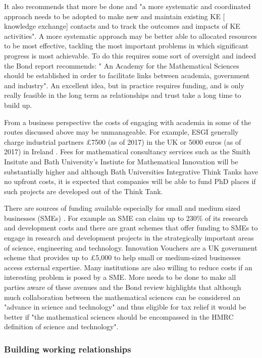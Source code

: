 \documentclass[11pt]{article} %
\begin{document}
	It also recommends that more be done  and "a more systematic and coordinated approach needs to be adopted to make new and maintain existing KE [ knowledge exchange] contacts and to track the outcomes and impacts of KE activities". A more systematic approach may be better able to allocated resources to be most effective, tackling the most important problems in which significant progress is most achievable. To do this requires some sort of oversight and indeed the Bond report recommends: " An Academy for the Mathematical Sciences should be established in order to facilitate links between academia, government and industry". An excellent idea, but in practice requires funding, and is only really feasible in the long term as relationships and trust take a long time to build up. 
	
	From a business perspective the costs of engaging with academia in some of the routes discussed above may be unmanageable. For example, ESGI generally charge industrial partners  £7500 (as of 2017) in the UK or 5000  euros (as of 2017) in Ireland \cite{ESGIhandbook}. Fees for mathematical consultancy services such as the Smith Insitute and Bath University's Instiute for Mathematical Innovation will be substantially higher and although Bath Universities Integrative Think Tanks have no upfront costs, it is expected that companies will be able to fund PhD places if such projects are developed out of the Think Tank. 
	
	There are sources of funding available especially for small and medium sized businesses (SMEs) \cite{IMI}. For example an SME can claim up to 230\% of its research and development costs \cite{Gov}  and there are grant schemes that offer funding to SMEs to engage in research and development projects in the strategically important areas of science, engineering and technology. Innovation Vouchers are a UK government scheme that	provides up to £5,000 to help small or medium-sized
	businesses access external expertise. Many institutions are also willing to reduce costs if an interesting problem is posed by a SME. More needs to be done to make all parties aware of these avenues and the Bond review \cite{Bond} highlights that although much collaboration between the mathematical sciences can be considered an "advance in science and technology" and thus eligible for tax relief it would be better if "the mathematical sciences should be encompassed in the HMRC definition of science and technology".
	
	
	\subsubsection{Building working relationships}
	
\end{document}
